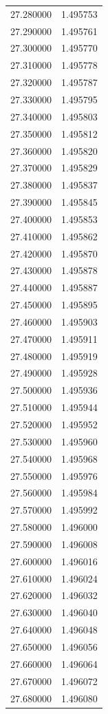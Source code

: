 \begin{tabular}{rr}
27.280000 & 1.495753 \\
27.290000 & 1.495761 \\
27.300000 & 1.495770 \\
27.310000 & 1.495778 \\
27.320000 & 1.495787 \\
27.330000 & 1.495795 \\
27.340000 & 1.495803 \\
27.350000 & 1.495812 \\
27.360000 & 1.495820 \\
27.370000 & 1.495829 \\
27.380000 & 1.495837 \\
27.390000 & 1.495845 \\
27.400000 & 1.495853 \\
27.410000 & 1.495862 \\
27.420000 & 1.495870 \\
27.430000 & 1.495878 \\
27.440000 & 1.495887 \\
27.450000 & 1.495895 \\
27.460000 & 1.495903 \\
27.470000 & 1.495911 \\
27.480000 & 1.495919 \\
27.490000 & 1.495928 \\
27.500000 & 1.495936 \\
27.510000 & 1.495944 \\
27.520000 & 1.495952 \\
27.530000 & 1.495960 \\
27.540000 & 1.495968 \\
27.550000 & 1.495976 \\
27.560000 & 1.495984 \\
27.570000 & 1.495992 \\
27.580000 & 1.496000 \\
27.590000 & 1.496008 \\
27.600000 & 1.496016 \\
27.610000 & 1.496024 \\
27.620000 & 1.496032 \\
27.630000 & 1.496040 \\
27.640000 & 1.496048 \\
27.650000 & 1.496056 \\
27.660000 & 1.496064 \\
27.670000 & 1.496072 \\
27.680000 & 1.496080 \\

\end{tabular}

